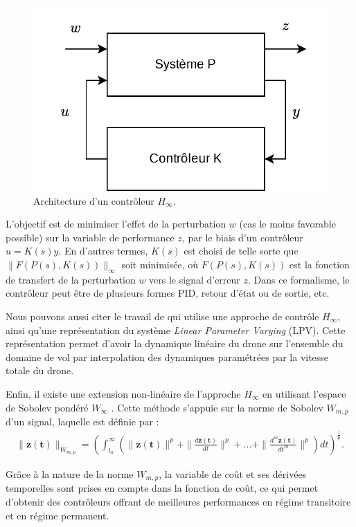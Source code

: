 \begin{figure}[ht!]
    \centerline{
    \includegraphics[trim=0cm 0cm 0cm 0cm,clip,width=0.5\columnwidth]{figures/lft.png}}
    \caption{Architecture d'un contrôleur $H_{\infty}$.}
    \label{fig:schemalft}
\end{figure}

L'objectif est de minimiser l'effet de la perturbation $w$  (cas le moins favorable possible) sur la variable de performance $z$, par le biais d'un contrôleur $u = K(s) y$. En d'autres termes, $K(s)$ est choisi de telle sorte que $\| F(P(s), K(s))\|_{\infty}$  soit minimisée, où $F(P(s), K(s))$ est la fonction de transfert de la perturbation $w$ vers le signal d'erreur $z$. 
Dans ce formalisme, le contrôleur peut être de plusieurs formes PID, retour d'état ou de sortie, etc.

Nous pouvons aussi citer le travail de \cite{SNYDER2021106621} qui utilise une approche de contrôle $H_{\infty}$, ainsi qu'une représentation du système \textit{Linear Parameter Varying} (LPV). Cette représentation permet d'avoir la dynamique linéaire du drone sur l'ensemble du domaine de vol par interpolation des dynamiques paramétrées par la vitesse totale du drone.

Enfin, il existe une extension non-linéaire de l'approche $H_{\infty}$ en utilisant l'espace de Sobolev pondéré $W_{\infty}$ \cite{cardoso2018nonlinear, CardosoEsteban2019, cardoso2021robust, cardoso2024robust}. Cette méthode s'appuie sur la norme de Sobolev $W_{m,p}$  d'un signal, laquelle est définie par :
\begin{align*}
    \|\boldsymbol{z(t)}\|_{W_{m,p}} = \left( \int_{t_{0}}^{\infty}(\|\boldsymbol{z(t)}\|^{p} + \|\frac{d \boldsymbol{z(t)}}{dt}\|^{p} + ... + \|\frac{d^{m} \boldsymbol{z(t)}}{dt^{m}}\|^{p}) dt \right)^{\frac{1}{p}}.
\end{align*}  

Grâce à la nature de la norme $W_{m,p}$, la variable de coût et ses dérivées temporelles sont prises en compte dans la fonction de coût, ce qui permet d'obtenir des contrôleurs offrant de meilleures performances en régime transitoire et en régime permanent.


